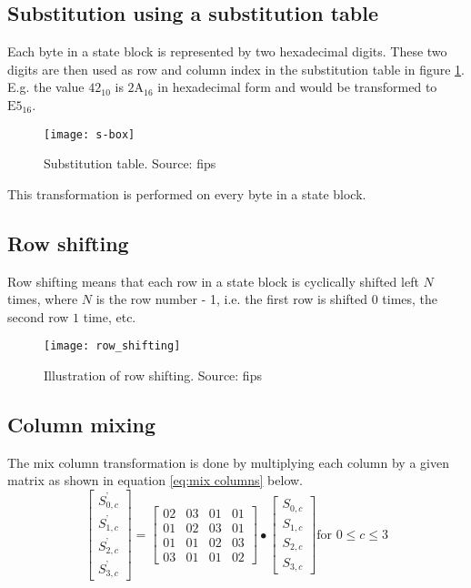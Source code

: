 \documentclass[report.tex]{subfiles}
\begin{document}
\clearpage

\subsection{Substitution using a substitution table}\label{sec:substitution}
Each byte in a state block is represented by two hexadecimal digits. These two digits are then used as row and column index in the substitution table in figure \ref{fig:s-box}. E.g. the value $\textrm{42}_{10}$ is $\textrm{2A}_{16}$ in hexadecimal form and would be transformed to $\textrm{E5}_{16}$.

\begin{figure}[ht]
\centering
\texttt{[image: s-box]}
\caption{Substitution table. Source: fips}
\label{fig:s-box}
\end{figure}

This transformation is performed on every byte in a state block.

\subsection{Row shifting}
Row shifting means that each row in a state block is cyclically shifted left $N$ times, where $N$ is the row number - 1, i.e. the first row is shifted $0$ times, the second row $1$ time, etc.

\begin{figure}[ht]
\centering
\texttt{[image: row\_shifting]}
\caption{Illustration of row shifting. Source: fips}
\label{fig:row_shifting}
\end{figure}

\subsection{Column mixing}
The mix column transformation is done by multiplying each column by a given matrix as shown in equation \ref{eq:mix columns} below.
\begin{equation}
\label{eq:mix columns}
	\begin{bmatrix}
	S_{0,c}^\text{'} \\
	S_{1,c}^\text{'} \\
	S_{2,c}^\text{'} \\
	S_{3,c}^\text{'}
	\end{bmatrix}
	=
	\begin{bmatrix}
	02 & 03 & 01 & 01 \\
	01 & 02 & 03 & 01 \\
	01 & 01 & 02 & 03 \\
	03 & 01 & 01 & 02
	\end{bmatrix}
	\bullet
	\begin{bmatrix}
	S_{0,c} \\
	S_{1,c} \\
	S_{2,c} \\
	S_{3,c}
	\end{bmatrix}
	\text{for }0 \leq c \leq 3
\end{equation}
\end{document}
